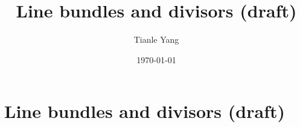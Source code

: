 \documentclass{noteformyself}
\title{Line bundles and divisors (draft)}
\author{Tianle Yang}
\date{\today}
\begin{document}
    \maketitle

    \section{Line bundles and divisors (draft)}


\end{document}

